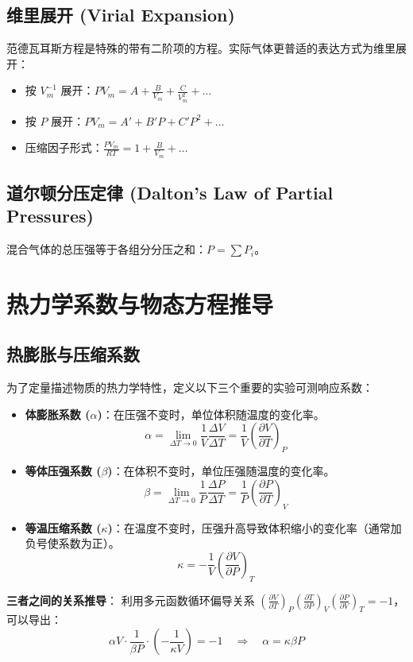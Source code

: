 \documentclass{article}
\begin{document}
\subsection{维里展开 (Virial Expansion)}
范德瓦耳斯方程是特殊的带有二阶项的方程。实际气体更普适的表达方式为维里展开：
\begin{itemize}
    \item 按 $V_m^{-1}$ 展开：$PV_m = A + \frac{B}{V_m} + \frac{C}{V_m^2} + \dots$
    \item 按 $P$ 展开：$PV_m = A' + B'P + C'P^2 + \dots$
    \item 压缩因子形式：$\frac{PV_m}{RT} = 1 + \frac{B}{V_m} + \dots$
\end{itemize}

\subsection{道尔顿分压定律 (Dalton's Law of Partial Pressures)}
混合气体的总压强等于各组分分压之和：$P = \sum P_i$。

\section{热力学系数与物态方程推导}

\subsection{热膨胀与压缩系数}
为了定量描述物质的热力学特性，定义以下三个重要的实验可测响应系数：
\begin{itemize}
    \item \textbf{体膨胀系数 ($\alpha$)}：在压强不变时，单位体积随温度的变化率。
    \[ \alpha = \lim_{\Delta T \to 0} \frac{1}{V} \frac{\Delta V}{\Delta T} = \frac{1}{V} \left( \frac{\partial V}{\partial T} \right)_P \]
    \item \textbf{等体压强系数 ($\beta$)}：在体积不变时，单位压强随温度的变化率。
    \[ \beta = \lim_{\Delta T \to 0} \frac{1}{P} \frac{\Delta P}{\Delta T} = \frac{1}{P} \left( \frac{\partial P}{\partial T} \right)_V \]
    \item \textbf{等温压缩系数 ($\kappa$)}：在温度不变时，压强升高导致体积缩小的变化率（通常加负号使系数为正）。
    \[ \kappa = - \frac{1}{V} \left( \frac{\partial V}{\partial P} \right)_T \]
\end{itemize}

\textbf{三者之间的关系推导}：
利用多元函数循环偏导关系 $\left( \frac{\partial V}{\partial T} \right)_P \left( \frac{\partial T}{\partial P} \right)_V \left( \frac{\partial P}{\partial V} \right)_T = -1$，可以导出：
\[ \alpha V \cdot \frac{1}{\beta P} \cdot \left( -\frac{1}{\kappa V} \right) = -1 \quad \Rightarrow \quad \alpha = \kappa \beta P \]
\end{document}
